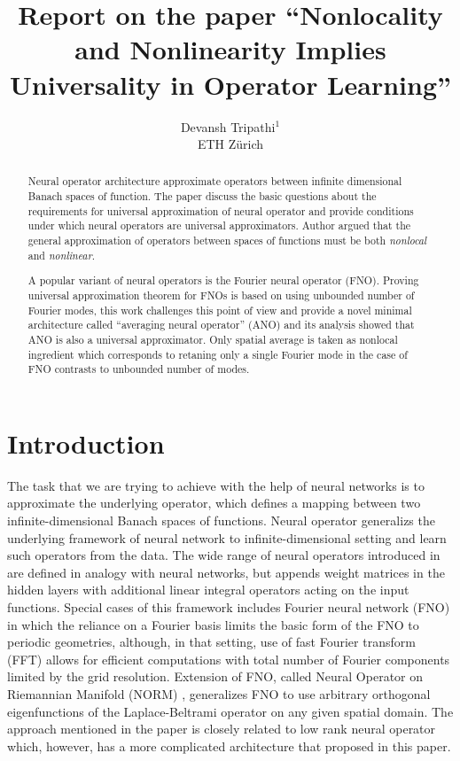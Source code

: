 \documentclass[reqno,9pt]{amsart}
\title{Report on the paper ``Nonlocality and Nonlinearity Implies Universality in Operator Learning''}
\author{Devansh Tripathi$^1$ \\ ETH Z\lowercase{\"urich}}
\theoremstyle{plain}
\theoremstyle{definition}
\begin{document}
\begin{abstract}
    Neural operator architecture approximate operators between infinite dimensional Banach spaces of function. The paper \cite{SL2024} discuss the basic questions about the requirements for universal approximation of neural operator and provide conditions under which neural operators are universal approximators. Author argued that the general approximation of operators between spaces of functions must be both {\it nonlocal} and {\it nonlinear}.

    A popular variant of neural operators is the Fourier neural operator (FNO). Proving universal approximation theorem for FNOs is based on using unbounded number of Fourier modes, this work challenges this point of view and provide a novel minimal architecture called ``averaging neural operator'' (ANO) and its analysis showed that ANO is also a universal approximator. Only spatial average is taken as nonlocal ingredient which corresponds to retaning only a single Fourier mode in the case of FNO contrasts to unbounded number of modes.    
\end{abstract}
\maketitle
\section{\bf \large Introduction}
\noindent The task that we are trying to achieve with the help of neural networks is to approximate the underlying operator, which defines a mapping between two infinite-dimensional Banach spaces of functions. Neural operator generalizs the underlying framework of neural network to infinite-dimensional setting and learn such operators from the data. The wide range of neural operators introduced in \cite{AAK2020, NK2023} are defined in analogy with neural networks, but appends weight matrices in the hidden layers with additional linear integral operators acting on the input functions. Special cases of this framework includes Fourier neural network (FNO) \cite{ZL2021} in which the reliance on a Fourier basis limits the basic form of the FNO to periodic geometries, although, in that setting, use of fast Fourier transform (FFT) allows for efficient computations with total number of Fourier components limited by the grid resolution. Extension of FNO, called Neural Operator on Riemannian Manifold (NORM) \cite{GC2023}, generalizes FNO to use arbitrary orthogonal eigenfunctions of the Laplace-Beltrami operator on any given  spatial domain. The approach mentioned in the paper is closely related to low rank neural operator \cite{NK2023} which, however, has a more complicated architecture that proposed in this paper.
\end{document}
